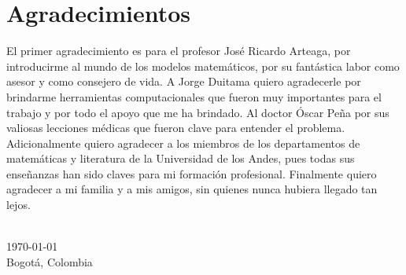 \chapter*{Agradecimientos}
El primer agradecimiento es para el profesor José Ricardo Arteaga, por introducirme al mundo de los modelos matemáticos, por su fantástica labor como asesor y como consejero de vida. A Jorge Duitama quiero agradecerle por brindarme herramientas computacionales que fueron muy importantes para el trabajo y por todo el apoyo que me ha brindado. Al doctor Óscar Peña por sus valiosas lecciones médicas que fueron clave para entender el problema. Adicionalmente quiero agradecer a los miembros de los departamentos de matemáticas y literatura de la Universidad de los Andes, pues todas sus enseñanzas han sido claves para mi formación profesional. Finalmente quiero agradecer a mi familia y a mis amigos, sin quienes nunca hubiera llegado tan lejos.   




{
\makeatletter
\vspace{1cm}
\raggedleft
\@author{}\\
\today{}\\
Bogotá, Colombia\\
\raggedright
\makeatother
}
